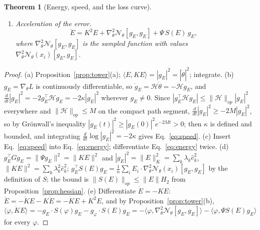 \documentclass[11pt]{article}
\newtheorem{theorem}{Theorem}
\theoremstyle{definition}
\theoremstyle{remark}
\newcommand{\Net}{\mathcal{N}_\theta}    %
\newcommand{\ip}[2]{\langle #1,#2\rangle}
\newcommand{\Hess}{\mathcal{H}}          %
\begin{document}
\begin{theorem}[Energy, speed, and the loss curve]
\begin{enumerate}[label=(\alph*)]
\begin{equation}
\begin{aligned}
\kappa_G &= \frac{g_E^\top Gg_E}{|g_E|^2} = \frac{\|KE\|^2}{\|E\|_K^2} = \frac{\sum_k\lambda_k^2\hat e_k^2}{\sum_k\lambda_k\hat e_k^2},\\
\kappa_S &= \frac{g_E^\top S(E)g_E}{|g_E|^2} = \frac{\ip{E}{\nabla^2_\theta\Net[g_E,g_E]}}{\|E\|_K^2},
\qquad |\kappa_S|\le H_2(\theta)\,\|E\| .
\end{aligned}
\end{equation}
$\kappa_G$ is the mean of the eigenvalues of $K$ under the weights $\lambda_k\hat e_k^2/\|E\|_K^2$, so it lies between the smallest and the largest eigenvalue on which the error has a component, and $\kappa_G\le\lambda_1$.
\item \emph{Acceleration of the error.}
\begin{equation}\label{eq:accel}
\ddot E = K^2E + \nabla^2_\theta\Net[g_E,g_E] + \Psi\,S(E)\,g_E ,
\end{equation}
where $\nabla^2_\theta\Net[g_E,g_E]$ is the sampled function with values $\nabla^2_\theta\Net(x_i)[g_E,g_E]$.
\end{enumerate}
\end{theorem}

\begin{proof}
(a) Proposition~\ref{prop:tower}(a); $\ip{E}{KE} = |g_E|^2 = |\dot\theta|^2$; integrate.
(b) $g_E = \nabla_\theta L$ is continuously differentiable, so $\dot g_E = \Hess\dot\theta = -\Hess g_E$, and $\frac{d}{dt}|g_E|^2 = -2g_E^\top\Hess g_E = -2\kappa|g_E|^2$ wherever $g_E\ne0$.
Since $|g_E^\top\Hess g_E|\le\|\Hess\|_{op}|g_E|^2$ everywhere and $\|\Hess\|_{op}\le M$ on the compact path segment, $\frac{d}{dt}|g_E|^2\ge-2M|g_E|^2$, so by Gr\"onwall's inequality $|g_E(t)|^2\ge|g_E(0)|^2e^{-2Mt} > 0$; then $\kappa$ is defined and bounded, and integrating $\frac{d}{dt}\log|g_E|^2 = -2\kappa$ gives Eq.~\eqref{eq:speed}.
(c) Insert Eq.~\eqref{eq:speed} into Eq.~\eqref{eq:energy}; differentiate Eq.~\eqref{eq:energy} twice.
(d) $g_E^\top Gg_E = \|\Psi g_E\|^2 = \|KE\|^2$ and $|g_E|^2 = \|E\|_K^2 = \sum_k\lambda_k\hat e_k^2$, $\|KE\|^2 = \sum_k\lambda_k^2\hat e_k^2$; $g_E^\top S(E)g_E = \frac1n\sum_iE_i\cdot\nabla^2_\theta\Net(x_i)[g_E,g_E]$ by the definition of $S$; the bound is $\|S(E)\|_{op}\le\|E\|H_2$ from Proposition~\ref{prop:hessian}.
(e) Differentiate $\dot E = -KE$: $\ddot E = -\dot KE - K\dot E = -\dot KE + K^2E$, and by Proposition~\ref{prop:tower}(b), $\ip{\varphi}{\dot KE} = -g_E\cdot S(\varphi)g_E - g_\varphi\cdot S(E)g_E = -\ip{\varphi}{\nabla^2_\theta\Net[g_E,g_E]} - \ip{\varphi}{\Psi S(E)g_E}$ for every $\varphi$.
\end{proof}
\end{document}
